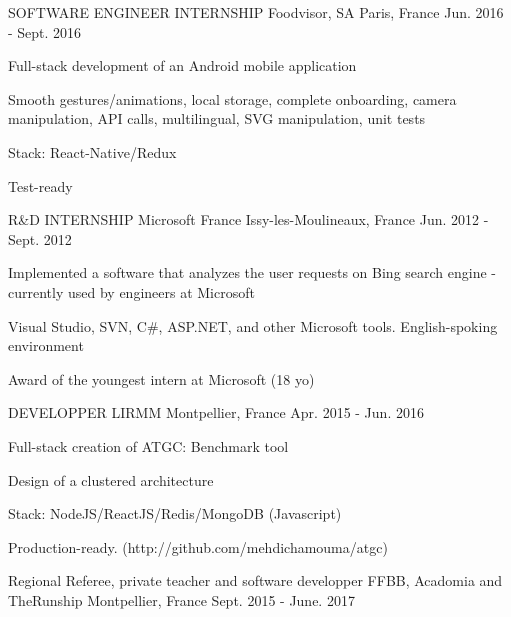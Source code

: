 \begin{cventries}
  \cventry
    {SOFTWARE ENGINEER INTERNSHIP}
    {Foodvisor, SA}
    {Paris, France}
    {Jun. 2016 - Sept. 2016}
    {
      \begin{cvitems}
        \item {Full-stack development of an Android mobile application}
        \item {Smooth gestures/animations, local storage, complete onboarding, camera manipulation, API calls, multilingual, SVG manipulation, unit tests}
        \item {Stack: React-Native/Redux }
        \item {Test-ready}
      \end{cvitems}
    }
  \cventry
    {R\&D INTERNSHIP}
    {Microsoft France}
    {Issy-les-Moulineaux, France}
    {Jun. 2012 - Sept. 2012}
    {
      \begin{cvitems}
        \item {Implemented a software that analyzes the user requests on Bing search engine - currently used by engineers at Microsoft}
        \item {Visual Studio, SVN, C#, ASP.NET, and other Microsoft tools. English-spoking environment}
        \item {Award of the youngest intern at Microsoft (18 yo)}
      \end{cvitems}
    }
  \cventry
    {DEVELOPPER}
    {LIRMM}
    {Montpellier, France}
    {Apr. 2015 - Jun. 2016}
    {
      \begin{cvitems}
        \item {Full-stack creation of ATGC: Benchmark tool}
        \item {Design of a clustered architecture}
        \item {Stack: NodeJS/ReactJS/Redis/MongoDB (Javascript)}
        \item {Production-ready. (http://github.com/mehdichamouma/atgc)}
      \end{cvitems}
    }
  \cventry
    {Regional Referee, private teacher and software developper}
    {FFBB, Acadomia and TheRunship}
    {Montpellier, France}
    {Sept. 2015 - June. 2017}
    {}
\end{cventries}
